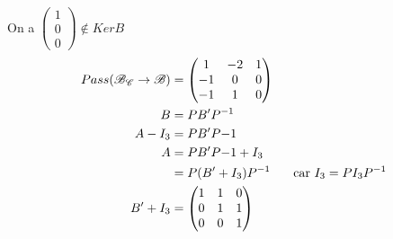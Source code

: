 \documentclass{article}
\begin{document}
On a \(\begin{pmatrix}
    1\\0\\0
\end{pmatrix} \notin KerB\)\begin{align*}
    Pass(\mathcal{B}_\mathcal{C} \to \mathcal{B}) &= \begin{pmatrix}
        1 & -2 & 1\\ -1 & 0 & 0 \\ -1 & 1 & 0
    \end{pmatrix}\\
    B &= PB'P^{-1}\\
    A-I_3 &= PB'P{-1}\\
    A &= PB'P{-1} + I_3\\
    &= P(B'+I_3)P^{-1} \indent \text{ car } I_3 = P I_3 P^{-1}\\
    B'+I_3 &= \begin{pmatrix}
        1 & 1& 0\\ 0 & 1& 1\\ 0& 0 & 1
    \end{pmatrix}
\end{align*}
\end{document}
